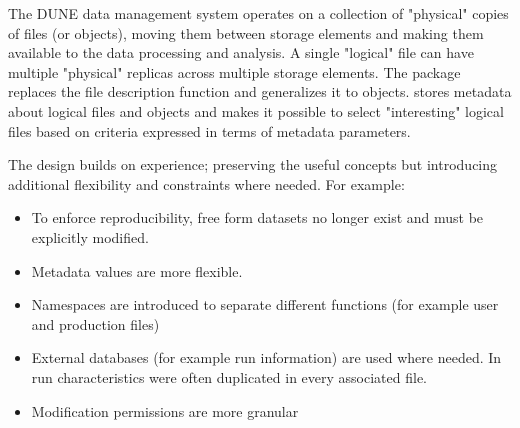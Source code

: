 \documentclass[../main-v1.tex]{subfiles}
\begin{document}
 
The DUNE data  management system operates on a collection of "physical" copies of files (or objects), moving them between storage elements and making them available to the data processing and analysis. 
A single  "logical" file can have multiple "physical" replicas across multiple storage elements. The  package replaces the  file description function and generalizes it to objects.  
 stores metadata about logical files and objects and makes it possible to select "interesting" logical files based on criteria expressed in terms of metadata parameters. 

The  design builds on  experience; preserving the useful concepts but introducing additional flexibility and constraints where needed.   For example:

\begin{itemize}  
\item To enforce reproducibility, free form datasets no longer exist and must be explicitly modified. 
\item Metadata values are more flexible.
\item Namespaces are introduced to separate different functions (for example user and production files)
\item External databases (for example run information) are used where needed.  In  run characteristics were often duplicated in every associated file.
\item Modification permissions are more granular
\end{itemize} 
\end{document}
